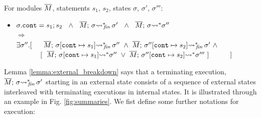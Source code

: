 \begin{auxLemma}
\label{lemma:subexp}
For modules $\overline{M}$, statements $s_1$, $s_2$,  states $\sigma$, $\sigma'$, $\sigma'''$:
\begin{itemize}
\item
$ \sigma.\texttt{cont} = s_1; s_2 \ \ \wedge\ \  \leadstoBoundedStarFin {\Mtwo}  {\sigma}  {\sigma'}\ \ 
\wedge \ \
\leadstoBoundedStar {\Mtwo}  {\sigma}  {\sigma''}\
$\\
$  \Longrightarrow$\\
$   \exists \sigma''.[\ \ \ \ \   \leadstoBoundedStarFin {\Mtwo} {\sigma[\texttt{cont}\mapsto s_1]}  {\sigma''}  
\ \wedge\ 
\leadstoBoundedStarFin {\Mtwo} {\sigma''[\texttt{cont}\mapsto s_2]}   {\sigma'} \  \wedge$
\\
$\strut \hspace{1.2cm}  [ \ \ \leadstoBoundedStar {\Mtwo} {\sigma[\texttt{cont}\mapsto s_1]}   {\sigma''}\ \vee \ \leadstoBoundedStar {\Mtwo}  {\sigma''[\texttt{cont}\mapsto s_2]}   {\sigma'''}\ ]\ \ \ \ \ \ \ \  \ ] $
\end{itemize}
\end{auxLemma}
 

Lemma \ref{lemma:external_breakdown} says that a terminating execution,  $ \overline{M};\, {\sigma} {\rightsquigarrow^*}\!\!_{\mathit{fin}}\, \sigma'$ starting in an external state  consists of a sequence of  external states interleaved with terminating executions in internal states. 
It %
is illustrated through an example in Fig. \ref{fig:summaries}.
We fist define some further notations for execution:

